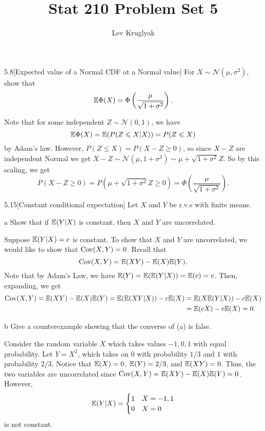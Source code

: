 \documentclass{pset}
\title{Stat 210 Problem Set 5}
\author{Lev Kruglyak}
\begin{document}
\maketitle
\collaborators

\begin{problem}{5.8}[Expected value of a Normal CDF at a Normal value]
  For $X\sim \mathcal{N}(\mu, \sigma^2)$, show that
  \[\mathbb{E}\Phi(X) = \Phi\left(\frac{\mu}{\sqrt{1+\sigma^2}}\right).\]
\end{problem}

\begin{solution}
  Note that for some independent $Z\sim \mathcal{N}(0,1)$, we have 
  \[
    \mathbb{E}\Phi(X) = \mathbb{E}(P(Z \leqslant X | X)) = P(Z\leqslant X)
  \]
  by Adam's law. However, $P(Z\leq X)=P(X-Z\geq 0)$, so since $X-Z$ are independent Normal we get $X-Z\sim \mathcal{N}(\mu, 1+\sigma^2)\sim \mu + \sqrt{1+\sigma^2} Z$. So by this scaling, we get
  \[P(X-Z\geq 0) = P\left(\mu + \sqrt{1+\sigma^2} Z \geq 0\right)=\Phi\left(\frac{\mu}{\sqrt{1+\sigma^2}}\right).\]
\end{solution}

\begin{problem}{5.15}[Constant conditional expectation]
  Let $X$ and $Y$ be r.v.s with finite means.
\end{problem}

\begin{parts}
  \begin{part}{a}
    Show that if $\mathbb{E}(Y|X)$ is constant, then $X$ and $Y$ are uncorrelated.
  \end{part}

  Suppose $\mathbb{E}(Y|X)=c$ is constant. To show that $X$ and $Y$ are uncorrelated, we would like to show that $\textrm{Cov}(X, Y) = 0$. Recall that
  \[\textrm{Cov}(X, Y) = \mathbb{E}(XY) - \mathbb{E}(X)\mathbb{E}(Y).\]
  Note that by Adam's Law, we have $\mathbb{E}(Y)=\mathbb{E}(\mathbb{E}(Y|X)) = \mathbb{E}(c)=c$. Then, expanding, we get
  \[
    \begin{aligned}
      \textrm{Cov}(X,Y)= \mathbb{E}(XY) - \mathbb{E}(X)\mathbb{E}(Y) = \mathbb{E}(\mathbb{E}(XY|X)) - c\mathbb{E}(X)&=\mathbb{E}(X\mathbb{E}(Y|X)) - c\mathbb{E}(X)\\ &= \mathbb{E}(cX)-c\mathbb{E}(X)=0.
  \end{aligned}
  \]

  \begin{part}{b}
    Give a counterexample showing that the converse of (a) is false.
  \end{part}

  Consider the random variable $X$ which takes values $-1, 0, 1$ with equal probability. Let $Y = X^2$, which takes on $0$ with probability $1/3$ and $1$ with probability $2/3$. Notice that $\mathbb{E}(X)=0$, $\mathbb{E}(Y) = 2/3$, and $\mathbb{E}(XY)=0$. Thus, the two variables are uncorrelated since $\textrm{Cov}(X,Y)=\mathbb{E}(XY)-\mathbb{E}(X)\mathbb{E}(Y)=0$. However,
  \[
    \mathbb{E}(Y|X) = \begin{cases}1 & X = -1,1\\ 0 & X = 0\end{cases}
  \]
  is not constant.
\end{parts}
\end{document}
